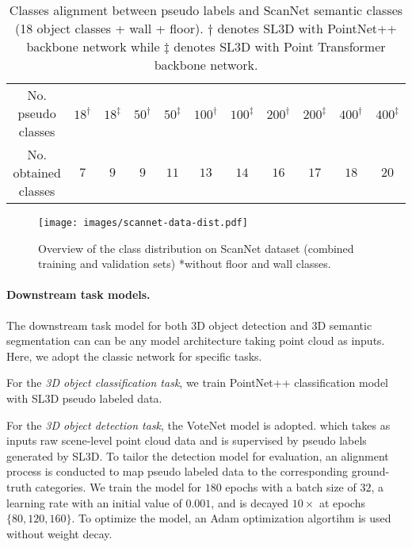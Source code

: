 \documentclass{article}
\begin{document}
\begin{table}[ht]
\caption{Classes alignment between pseudo labels and ScanNet semantic classes (18 object classes + wall + floor). $\dagger$ denotes SL3D with PointNet++ backbone network while $\ddagger$ denotes SL3D with Point Transformer backbone network.}
\centering
\begin{tabular}{c | c c c c c c c c c c}

\toprule

 {No. pseudo classes} & {$18^\dagger$} & {$18^\ddagger$} & {$50^\dagger$} & {$50^\ddagger$} & {$100^\dagger$} & {$100^\ddagger$} & {$200^\dagger$} & {$200^\ddagger$} & {$400^\dagger$} & {$400^\ddagger$} \\  
 {No. obtained classes} & {$7$} & {$9$} & {$9$} & {$11$} & {$13$} & {$14$} & {$16$} & {$17$} & {$18$} & {$20$} \\ \bottomrule
\end{tabular}
\label{table:1}
\end{table}

\vspace{-5mm}

\begin{wrapfigure}{r}{5.5cm}
\label{wrap-fig:1}
\texttt{[image: images/scannet-data-dist.pdf]}
\caption{Overview of the class distribution on ScanNet dataset (combined training and validation sets) *without floor and wall classes.}
\end{wrapfigure}

\paragraph{Downstream task models. } The downstream task model for both 3D object detection and 3D semantic segmentation can can be any model architecture taking point cloud as inputs. Here, we adopt the classic network for specific tasks.


For the \textit{3D object classification task}, we train PointNet++ \cite{qi2017pointnetplusplus} classification model with SL3D pseudo labeled data. 


For the \textit{3D object detection task}, the VoteNet \cite{qi2019deep} model is adopted. which takes as inputs raw scene-level point cloud data and is supervised by pseudo labels generated by SL3D. To tailor the detection model for evaluation, an alignment process is conducted to map pseudo labeled data to the corresponding ground-truth categories.
We train the model for $180$ epochs with a batch size of $32$, a learning rate with an initial value of $0.001$, and is decayed $10\times$ at epochs $\{80, 120, 160\}$. 
To optimize the model, an Adam optimization algortihm is used without weight decay. 
\end{document}
